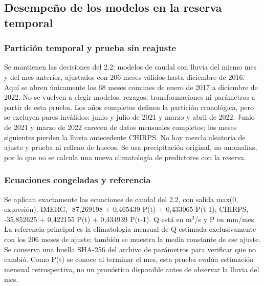 \documentclass[10pt,a4paper]{article}
\begin{document}
\subsection{Desempeño de los modelos en la reserva temporal}
\subsubsection*{Partición temporal y prueba sin reajuste}
Se mantienen las decisiones del 2.2: modelos de caudal con lluvia del mismo mes y del mes anterior, ajustados con 206 meses válidos hasta diciembre de 2016. Aquí se abren únicamente los 68 meses comunes de enero de 2017 a diciembre de 2022. No se vuelven a elegir modelos, rezagos, transformaciones ni parámetros a partir de esta prueba. Los años completos definen la partición cronológica, pero se excluyen pares inválidos: junio y julio de 2021 y marzo y abril de 2022. Junio de 2021 y marzo de 2022 carecen de datos mensuales completos; los meses siguientes pierden la lluvia antecedente CHIRPS. No hay mezcla aleatoria de ajuste y prueba ni relleno de huecos. Se usa precipitación original, no anomalías, por lo que no se calcula una nueva climatología de predictores con la reserva.
\subsubsection*{Ecuaciones congeladas y referencia}
Se aplican exactamente las ecuaciones de caudal del 2.2, con salida max(0, expresión): IMERG, -87,269198 + 0,465439 P(t) + 0,433065 P(t-1); CHIRPS, -35,852625 + 0,422155 P(t) + 0,434939 P(t-1). Q está en m$^3$/s y P en mm/mes. La referencia principal es la climatología mensual de Q estimada exclusivamente con los 206 meses de ajuste; también se muestra la media constante de ese ajuste. Se conserva una huella SHA-256 del archivo de parámetros para verificar que no cambió. Como P(t) se conoce al terminar el mes, esta prueba evalúa estimación mensual retrospectiva, no un pronóstico disponible antes de observar la lluvia del mes.
\end{document}
